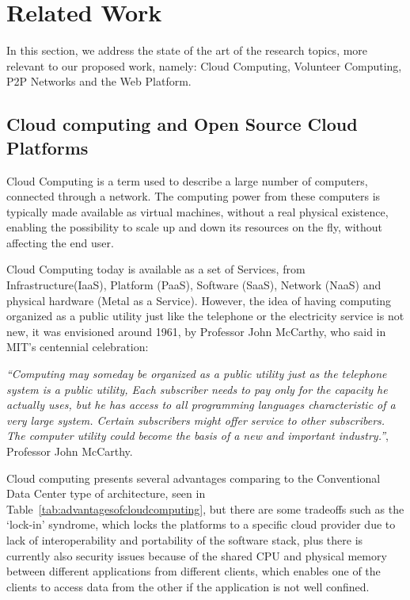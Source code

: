 
% 
% 

\section{Related Work}

In this section, we address the state of the art of the research topics, more relevant to our proposed work, namely: Cloud Computing, Volunteer Computing, P2P Networks and the Web Platform.

% 
% 
\subsection{Cloud computing and Open Source Cloud Platforms}

Cloud Computing is a term used to describe a large number of computers, connected through a network. The computing power from these computers is typically made available as virtual machines, without a real physical existence, enabling the possibility to scale up and down its resources on the fly, without affecting the end user.

Cloud Computing today is available as a set of Services, from Infrastructure(IaaS), Platform (PaaS), Software (SaaS), Network (NaaS) and physical hardware (Metal as a Service). However, the idea of having computing organized as a public utility just like the telephone or the electricity service is not new, it was envisioned around 1961, by Professor John McCarthy, who said in MIT's centennial celebration:

  \textit{``Computing may someday be organized as a public utility just as the telephone system is a public utility, Each subscriber needs to pay only for the capacity he actually uses, but he has access to all programming languages characteristic of a very large system. Certain subscribers might offer service to other subscribers. The computer utility could become the basis of a new and important industry.''}, Professor John McCarthy.

Cloud computing presents several advantages comparing to the Conventional Data Center type of architecture\cite{Armbrust}, seen in Table~\ref{tab:advantagesofcloudcomputing}, but there are some tradeoffs such as the `lock-in' syndrome, which locks the platforms to a specific cloud provider due to lack of interoperability and portability of the software stack, plus there is currently also security issues because of the shared CPU and physical memory between different applications from different clients, which enables one of the clients to access data from the other if the application is not well confined.

